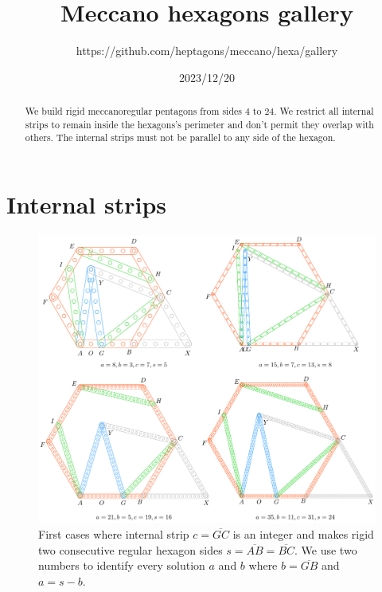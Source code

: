\documentclass[11pt]{article}
\title{Meccano hexagons gallery}
\author{https://github.com/heptagons/meccano/hexa/gallery}
\date{2023/12/20}
\begin{document}
\maketitle
\begin{abstract}
We build rigid meccano\meccanoref regular pentagons from sides $4$ to $24$. We restrict all internal strips to remain inside the hexagons's perimeter and don't permit they overlap with others. The internal strips must not be parallel to any side of the hexagon.
\end{abstract}


\section{Internal strips}

\begin{figure}[h]
\centering
\includegraphics[scale=0.9]{build/hexa-builder-a}
\caption{First cases where internal strip $c = \overline{GC}$ is an integer and makes rigid two consecutive regular hexagon sides $s = \overline{AB} = \overline{BC}$. We use two numbers to identify every solution $a$ and $b$ where $b = \overline{GB}$ and $a = s - b$.}
\label{fig:builder-a}
\end{figure}
\end{document}
